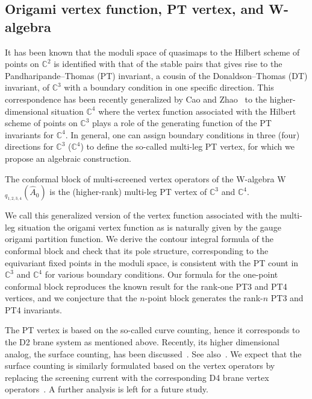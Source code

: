 \subsection{Origami vertex function, PT vertex, and W-algebra}

It has been known that the moduli space of quasimaps to the Hilbert scheme of points on $\mathbb{C}^2$ is identified with that of the stable pairs that gives rise to the Pandharipande--Thomas (PT) invariant, a cousin of the Donaldson--Thomas (DT) invariant, of $\mathbb{C}^3$ with a boundary condition in one specific direction.
This correspondence has been recently generalized by Cao and Zhao~\cite{Cao:2023lon} to the higher-dimensional situation $\mathbb{C}^4$ where the vertex function associated with the Hilbert scheme of points on $\mathbb{C}^3$ plays a role of the generating function of the PT invariants for $\mathbb{C}^4$.
In general, one can assign boundary conditions in three (four) directions for $\mathbb{C}^3$ ($\mathbb{C}^4$) to define the so-called multi-leg PT vertex, for which we propose an algebraic construction.
\begin{conjecture}
    The conformal block of multi-screened vertex operators of the W-algebra W$_{q_{1,2,3,4}}(\widehat{A}_{0})$ is the (higher-rank) multi-leg PT vertex of $\mathbb{C}^3$ and $\mathbb{C}^4$.
\end{conjecture}
We call this generalized version of the vertex function associated with the multi-leg situation the origami vertex function as is naturally given by the gauge origami partition function.
We derive the contour integral formula of the conformal block and check that its pole structure, corresponding to the equivariant fixed points in the moduli space, is consistent with the PT count in $\mathbb{C}^3$ and $\mathbb{C}^4$ for various boundary conditions.
Our formula for the one-point conformal block reproduces the known result for the rank-one PT3 and PT4 vertices, and we conjecture that the $n$-point block generates the rank-$n$ PT3 and PT4 invariants.

The PT vertex is based on the so-called curve counting, hence it corresponds to the D2 brane system as mentioned above. 
Recently, its higher dimensional analog, the surface counting, has been discussed~\cite{Bae:2022pif,Bae:2024bpx}.
See also~\cite{Nekrasov:2023nai}.
We expect that the surface counting is similarly formulated based on the vertex operators by replacing the screening current with the corresponding D4 brane vertex operators~\cite{Kimura:2023bxy}.
A further analysis is left for a future study.


